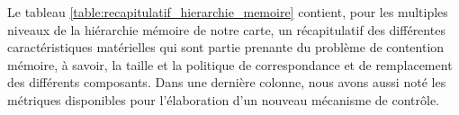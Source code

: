 Le tableau \ref{table:recapitulatif_hierarchie_memoire} contient, pour les multiples niveaux de la hiérarchie mémoire de notre carte, un récapitulatif des différentes caractéristiques matérielles qui sont partie prenante du problème de contention mémoire, à savoir, la taille et la politique de correspondance et de remplacement des différents composants.
Dans une dernière colonne, nous avons aussi noté les métriques disponibles pour l’élaboration d’un nouveau mécanisme de contrôle.

\begin{table}[!h]
    \renewcommand{\arraystretch}{1.5}
    \caption{Récapitulatif des caractéristiques matérielles des différents niveaux de la hiérarchie mémoire.}
	\label{table:recapitulatif_hierarchie_memoire}
\end{table}
